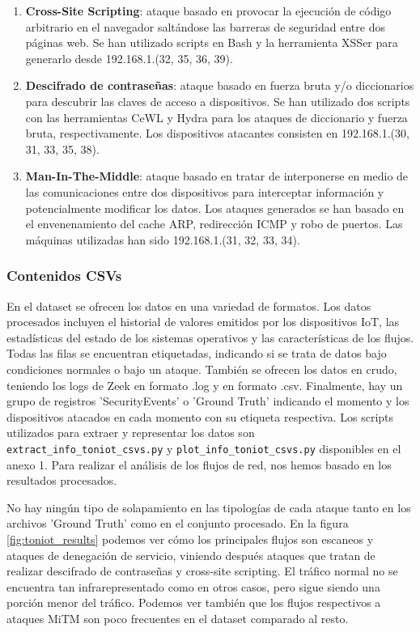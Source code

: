 \begin{enumerate}
  \item \textbf{Cross-Site Scripting}: ataque basado en provocar la ejecución de código arbitrario en el navegador saltándose las barreras de seguridad entre dos páginas web. Se han utilizado scripts en Bash y la herramienta XSSer para generarlo desde 192.168.1.(32, 35, 36, 39).
  \item \textbf{Descifrado de contraseñas}: ataque basado en fuerza bruta y/o diccionarios para descubrir las claves de acceso a dispositivos. Se han utilizado dos scripts con las herramientas CeWL y Hydra para los ataques de diccionario y fuerza bruta, respectivamente. Los dispositivos atacantes consisten en 192.168.1.(30, 31, 33, 35, 38).
  \item \textbf{Man-In-The-Middle}: ataque basado en tratar de interponerse en medio de las comunicaciones entre dos dispositivos para interceptar información y potencialmente modificar los datos. Los ataques generados se han basado en el envenenamiento del cache ARP, redirección ICMP y robo de puertos. Las máquinas utilizadas han sido 192.168.1.(31, 32, 33, 34).
\end{enumerate}

\subsubsection{Contenidos CSVs}

En el dataset se ofrecen los datos en una variedad de formatos. Los datos procesados incluyen el historial de valores emitidos por los dispositivos IoT, las estadísticas del estado de los sistemas operativos y las características de los flujos. Todas las filas se encuentran etiquetadas, indicando si se trata de datos bajo condiciones normales o bajo un ataque. También se ofrecen los datos en crudo, teniendo los logs de Zeek en formato .log y en formato .csv. Finalmente, hay un grupo de registros 'SecurityEvents' o 'Ground Truth' indicando el momento y los dispositivos atacados en cada momento con su etiqueta respectiva. Los scripts utilizados para extraer y representar los datos son \texttt{extract\_info\_toniot\_csvs.py} y \texttt{plot\_info\_toniot\_csvs.py} disponibles en el anexo 1. Para realizar el análisis de los flujos de red, nos hemos basado en los resultados procesados.

No hay ningún tipo de solapamiento en las tipologías de cada ataque tanto en los archivos 'Ground Truth' como en el conjunto procesado. En la figura \ref{fig:toniot_results} podemos ver cómo los principales flujos son escaneos y ataques de denegación de servicio, viniendo después ataques que tratan de realizar descifrado de contraseñas y cross-site scripting. El tráfico normal no se encuentra tan infrarepresentado como en otros casos, pero sigue siendo una porción menor del tráfico. Podemos ver también que los flujos respectivos a ataques MiTM son poco frecuentes en el dataset comparado al resto.

